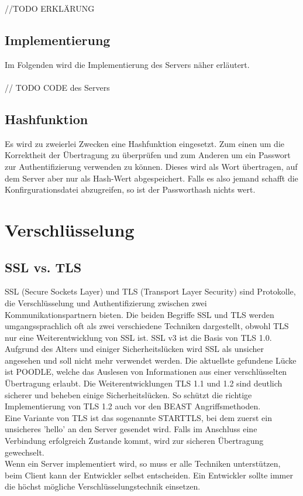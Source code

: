 //TODO ERKLÄRUNG

\subsection{Implementierung}
Im Folgenden wird die Implementierung des Servers näher erläutert. \\\\
	
	// TODO CODE des Servers


\subsection{Hashfunktion}
Es wird zu zweierlei Zwecken eine Hashfunktion eingesetzt. Zum einen um die Korrektheit der Übertragung zu überprüfen und zum Anderen um ein Passwort zur Authentifizierung verwenden zu können. Dieses wird als Wort übertragen, auf dem Server aber nur als Hash-Wert abgespeichert. Falls es also jemand schafft die Konfirgurationsdatei abzugreifen, so ist der Passworthash nichts wert. 

\section{Verschlüsselung}
\subsection{SSL vs. TLS}
SSL (Secure Sockets Layer) und TLS (Transport Layer Security) sind Protokolle, die Verschlüsselung und Authentifizierung zwischen zwei Kommunikationspartnern bieten. Die beiden Begriffe SSL und TLS werden umgangssprachlich oft als zwei verschiedene Techniken dargestellt, obwohl TLS nur eine Weiterentwicklung von SSL ist. SSL v3 ist die Basis von TLS 1.0. \\
Aufgrund des Alters und einiger Sicherheitslücken wird SSL als unsicher angesehen und soll nicht mehr verwendet werden. Die aktuellste gefundene Lücke ist POODLE, welche das Auslesen von Informationen aus einer verschlüsselten Übertragung erlaubt. Die Weiterentwicklungen TLS 1.1 und 1.2 sind deutlich sicherer und beheben einige Sicherheitslücken. So schützt die richtige Implementierung von TLS 1.2 auch vor den BEAST Angriffsmethoden.\\
Eine Variante von TLS ist das sogenannte STARTTLS, bei dem zuerst ein unsicheres 'hello' an den Server gesendet wird. Falls im Anschluss eine Verbindung erfolgreich Zustande kommt, wird zur sicheren Übertragung gewechselt. \\
Wenn ein Server implementiert wird, so muss er alle Techniken unterstützen, beim Client kann der Entwickler selbst entscheiden. Ein Entwickler sollte immer die höchst mögliche Verschlüsselungstechnik einsetzen. \\

